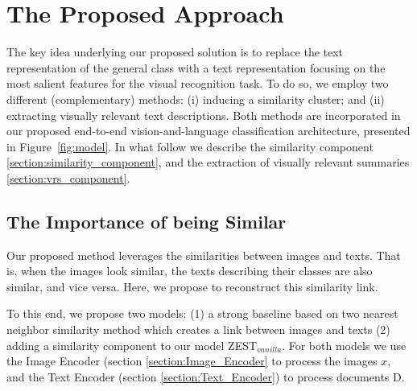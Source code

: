 \documentclass[11pt,a4paper]{article}
\newcommand\yuval[1]{\textcolor{darkpink}{\textbf{YUVAL:} #1 }}
\begin{document}
\section{The Proposed Approach}
\label{sections:ZEST}
The key idea underlying our proposed solution is to replace the text representation of the general class with a text representation focusing on the most salient features for the visual recognition task.
To do so, we employ two different (complementary) methods: (i) inducing a similarity cluster; and (ii) extracting visually relevant text descriptions. Both methods are incorporated in our proposed end-to-end vision-and-language classification architecture, presented in Figure~\ref{fig:model}. In what follow we describe the similarity component \ref{section:similarity_component}, and the extraction of visually relevant summaries \ref{section:vrs_component}.


\subsection{The Importance of being Similar}

Our proposed method leverages the similarities between images and texts. That is, when the images look similar, the texts describing their classes are also similar, and vice versa. Here, we propose
to reconstruct this similarity link. 






 To this end, we propose two models: (1) a strong baseline based on two nearest neighbor similarity method which creates a link between images and texts (2) adding a similarity component to our model ZEST$_{vanilla}$.
For both models we use the Image Encoder (section \ref{section:Image_Encoder} to process the images $x$, and the Text Encoder (section \ref{section:Text_Encoder}) to process documents D.
\end{document}
